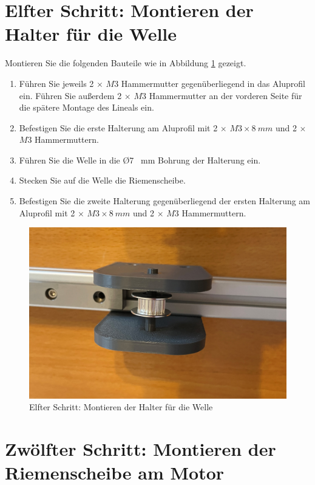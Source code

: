\section{Elfter Schritt: Montieren der Halter für die Welle}

Montieren Sie die folgenden Bauteile wie in Abbildung \ref{11.S} gezeigt.

\begin{enumerate}
	\item Führen Sie jeweils 2 $\times$ $ M3 $ Hammermutter gegenüberliegend in das Aluprofil ein. Führen Sie außerdem 2 $\times$ $ M3 $ Hammermutter an der vorderen Seite für die spätere Montage des Lineals ein. 
	\item Befestigen Sie die erste Halterung am Aluprofil mit 2 $\times$ $ M3 \times 8 \ mm $ und 2 $\times$ $ M3 $ Hammermuttern.
	\item Führen Sie die Welle in die \O 7 \ mm Bohrung der Halterung ein.
	\item Stecken Sie auf die Welle die Riemenscheibe.
	\item Befestigen Sie die zweite Halterung gegenüberliegend der ersten Halterung am Aluprofil mit 2 $\times$ $ M3 \times 8 \ mm $ und 2 $\times$ $ M3 $ Hammermuttern.
\end{enumerate}

\begin{figure}[H]
	\begin{center}
		\includegraphics[width=\textwidth]{Images/11Schr.jpg}
		\caption{Elfter Schritt: Montieren der Halter für die Welle} \label{11.S}
	\end{center}
\end{figure}


\section{Zwölfter Schritt: Montieren der Riemenscheibe am Motor}

